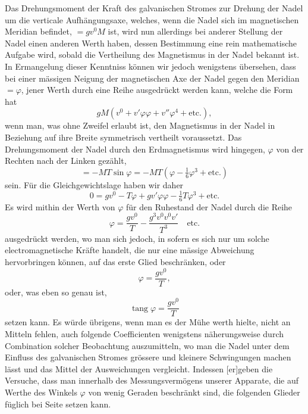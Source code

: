 Das Drehungsmoment der Kraft des galvanischen Stromes zur Drehung der Nadel um die verticale Aufhängungsaxe, welches, wenn die Nadel sich im
\clearpage{}
\noindent magnetischen Meridian befindet, $=gv^0M$ ist, wird nun allerdings bei anderer Stellung der Nadel einen anderen Werth haben, dessen Bestimmung eine rein mathematische Aufgabe wird, sobald die Vertheilung des Magnetismus in der Nadel bekannt ist. In Ermangelung dieser Kenntniss können wir jedoch wenigstens übersehen, dass bei einer mässigen Neigung der magnetischen Axe der Nadel gegen den Meridian $=\varphi$, jener Werth durch eine Reihe ausgedrückt werden kann, welche die Form hat
\[
gM(v^0+v'\varphi\varphi+v''\varphi^4+\text{etc.}),
\]
\noindent wenn man, was ohne Zweifel erlaubt ist, den Magnetismus in der Nadel in Beziehung auf ihre Breite symmetrisch vertheilt voraussetzt. Das Drehungsmoment der Nadel durch den Erdmagnetismus wird hingegen, $\varphi$ von der Rechten nach der Linken gezählt,
\[
=-MT\sin\varphi=-MT(\varphi-\tfrac16\varphi^3+\text{etc.})
\]
\noindent sein. Für die Gleichgewichtslage haben wir daher
\[
0=gv^0-T\varphi+gv'\varphi\varphi-\tfrac16T\varphi^3+\text{etc.}
\]
\noindent Es wird mithin der Werth von $\varphi$ für den Ruhestand der Nadel durch die Reihe
\[
\varphi=\frac{gv^0}{T}-\frac{g^3v^0v^0v'}{T^3}\quad\text{etc.}
\]
\noindent ausgedrückt werden, wo man sich jedoch, in sofern es sich nur um solche electromagnetische Kräfte handelt, die nur eine mässige Abweichung hervorbringen können, auf das erste Glied beschränken, oder
\[
\varphi=\frac{gv^0}{T},
\]
\noindent oder, was eben so genau ist,
\[
\operatorname{tang}\varphi=\frac{gv^0}{T}
\]
\noindent setzen kann. Es würde übrigens, wenn man es der Mühe werth hielte, nicht an Mitteln fehlen, auch folgende Coefficienten wenigstens näherungsweise durch Combination solcher Beobachtung auszumitteln, wo man die Nadel unter dem Einfluss des galvanischen Stromes grössere und kleinere Schwingungen machen lässt und das Mittel der Ausweichungen vergleicht. Indessen [er]geben die Versuche, dass man innerhalb des Messungsvermögens unserer Apparate, die auf
\clearpage{}
\noindent Werthe des Winkels $\varphi$ von wenig Geraden beschränkt sind, die folgenden Glieder füglich bei Seite setzen kann.
\clearpage\endgroup

